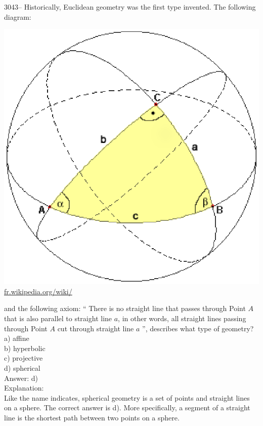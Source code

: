 \documentclass[letterpaper, 12pt]{article}
\begin{document}
3043-- Historically, Euclidean geometry was the first type invented. The following diagram:
\begin{center}
\includegraphics[scale=0.5]{geospher.eps}\\
\href{http://fr.wikipedia.org/wiki/Trigonom\%C3\%A9trie sph\%C3\%A9rique}{fr.wikipedia.org/wiki/}\\[5mm]
\end{center}
and the following axiom: `` There is no straight line that passes through Point $A$ that is also parallel to straight line $a$, in other words, all straight lines passing through Point $A$ cut through straight line $a$ '', describes what type of geometry?\\

a) affine\\
b) hyperbolic\\
c) projective\\
d) spherical\\

Answer: d)\\

Explanation:\\
Like the name indicates, spherical geometry is a set of points and straight lines on a sphere. The correct answer is d). More specifically, a segment of a straight line is the shortest path between two points on a sphere.\\
\end{document}
